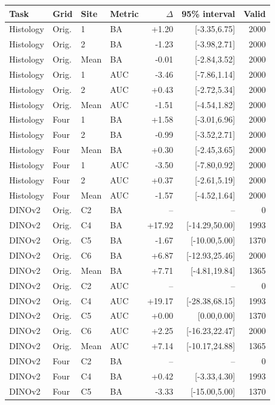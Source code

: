 \begingroup\small\setlength{\tabcolsep}{4pt}
\begin{longtable}{llllrrr}
\toprule
Task & Grid & Site & Metric & $\Delta$ & 95\% interval & Valid \\ \midrule
Histology & Orig. & 1 & BA & +1.20 & [-3.35,6.75] & 2000 \\
Histology & Orig. & 2 & BA & -1.23 & [-3.98,2.71] & 2000 \\
Histology & Orig. & Mean & BA & -0.01 & [-2.84,3.52] & 2000 \\
Histology & Orig. & 1 & AUC & -3.46 & [-7.86,1.14] & 2000 \\
Histology & Orig. & 2 & AUC & +0.43 & [-2.72,5.34] & 2000 \\
Histology & Orig. & Mean & AUC & -1.51 & [-4.54,1.82] & 2000 \\
Histology & Four & 1 & BA & +1.58 & [-3.01,6.96] & 2000 \\
Histology & Four & 2 & BA & -0.99 & [-3.52,2.71] & 2000 \\
Histology & Four & Mean & BA & +0.30 & [-2.45,3.65] & 2000 \\
Histology & Four & 1 & AUC & -3.50 & [-7.80,0.92] & 2000 \\
Histology & Four & 2 & AUC & +0.37 & [-2.61,5.19] & 2000 \\
Histology & Four & Mean & AUC & -1.57 & [-4.52,1.64] & 2000 \\
DINOv2 & Orig. & C2 & BA & -- & -- & 0 \\
DINOv2 & Orig. & C4 & BA & +17.92 & [-14.29,50.00] & 1993 \\
DINOv2 & Orig. & C5 & BA & -1.67 & [-10.00,5.00] & 1370 \\
DINOv2 & Orig. & C6 & BA & +6.87 & [-12.93,25.46] & 2000 \\
DINOv2 & Orig. & Mean & BA & +7.71 & [-4.81,19.84] & 1365 \\
DINOv2 & Orig. & C2 & AUC & -- & -- & 0 \\
DINOv2 & Orig. & C4 & AUC & +19.17 & [-28.38,68.15] & 1993 \\
DINOv2 & Orig. & C5 & AUC & +0.00 & [0.00,0.00] & 1370 \\
DINOv2 & Orig. & C6 & AUC & +2.25 & [-16.23,22.47] & 2000 \\
DINOv2 & Orig. & Mean & AUC & +7.14 & [-10.17,24.88] & 1365 \\
DINOv2 & Four & C2 & BA & -- & -- & 0 \\
DINOv2 & Four & C4 & BA & +0.42 & [-3.33,4.30] & 1993 \\
DINOv2 & Four & C5 & BA & -3.33 & [-15.00,5.00] & 1370 \\

\end{longtable}

